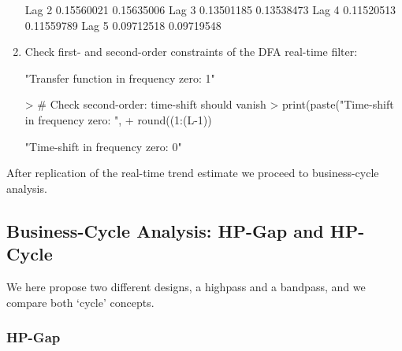 \documentclass[a4paper]{book}
\begin{document}
\begin{enumerate}
\begin{Schunk}
\begin{Soutput}
Lag  2         0.15560021   0.15635006
Lag  3         0.13501185   0.13538473
Lag  4         0.11520513   0.11559789
Lag  5         0.09712518   0.09719548
\end{Soutput}
\end{Schunk}
\item Check first- and second-order constraints of the DFA real-time filter:
\begin{Schunk}
\begin{Soutput}
[1] "Transfer function in frequency zero: 1"
\end{Soutput}
\begin{Sinput}
> # Check second-order: time-shift should vanish
> print(paste("Time-shift in frequency zero: ",
+             round((1:(L-1))%
\end{Sinput}
\begin{Soutput}
[1] "Time-shift in frequency zero: 0"
\end{Soutput}
\end{Schunk}
\end{enumerate}
After replication of the real-time trend estimate we proceed to business-cycle analysis.



\subsection{Business-Cycle Analysis: HP-Gap and HP-Cycle}

We here propose two different designs, a highpass and a bandpass, and we compare both `cycle' concepts.

\subsubsection{HP-Gap}
\end{document}

